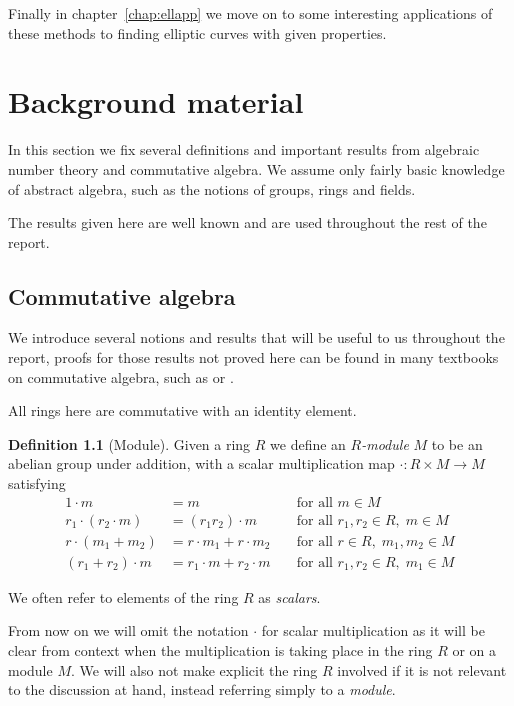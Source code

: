 \documentclass[12pt,a4paper,abstracton,bibtotoc]{scrreprt}
\theoremstyle{definition}
\newtheorem{defn}{Definition}
\begin{document}
Finally in chapter~\ref{chap:ellapp} we move on to some interesting applications of these methods to finding elliptic curves with given properties.


\chapter{Background material}
\label{chap:background}

In this section we fix several definitions and important results from algebraic number theory and commutative algebra.
We assume only fairly basic knowledge of abstract algebra, such as the notions of groups, rings and fields.

The results given here are well known and are used throughout the rest of the report.

\section{Commutative algebra}
\label{sec:ca}
We introduce several notions and results that will be useful to us throughout the report, proofs for those results not proved here can be found in many textbooks on commutative algebra, such as \cite{am} or \cite{matsumura}.

All rings here are commutative with an identity element.
\begin{defn}[Module]
Given a ring $R$ we define an \emph{$R$-module} $M$ to be an abelian group under addition, with a scalar multiplication map $\cdot \colon R\times M \to M$ satisfying
\begin{align*}
1\cdot m &= m \; &&\text{for all } m\in M \\
r_1\cdot(r_2 \cdot m) &= (r_1r_2)\cdot m \; &&\text{for all } r_1,r_2\in R,\; m\in M \\
r\cdot(m_1 + m_2) &= r\cdot m_1 + r\cdot m_2 \; &&\text{for all } r\in R, \; m_1,m_2\in M \\
(r_1 + r_2)\cdot m &= r_1\cdot m + r_2\cdot m \; &&\text{for all } r_1,r_2\in R, \; m_1\in M
\end{align*}
\end{defn}

We often refer to elements of the ring $R$ as \emph{scalars}.

From now on we will omit the notation $\cdot$ for scalar multiplication as it will be clear from context when the multiplication is taking place in the ring $R$ or on a module $M$.
We will also not make explicit the ring $R$ involved if it is not relevant to the discussion at hand, instead referring simply to a \emph{module}.
\end{document}
